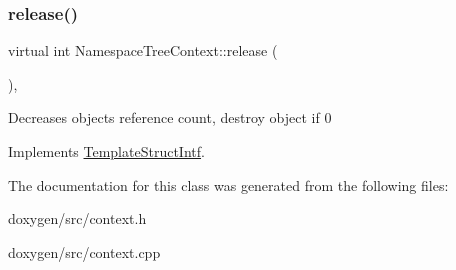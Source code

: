 \mbox{\label{class_namespace_tree_context_aa867e3f0d1ad5b49d6b0c72528f54c2e}} 
\subsubsection{\texorpdfstring{release()}{release()}}
{\footnotesize\ttfamily virtual int Namespace\+Tree\+Context\+::release (\begin{DoxyParamCaption}{ }\end{DoxyParamCaption})\hspace{0.3cm}{\ttfamily [inline]}, {\ttfamily [virtual]}}

Decreases object\textquotesingle{}s reference count, destroy object if 0 

Implements \mbox{\hyperlink{class_template_struct_intf_a3dce7dd29d3f66a8080b40578e8a5045}{Template\+Struct\+Intf}}.



The documentation for this class was generated from the following files\+:\begin{DoxyCompactItemize}
\item 
doxygen/src/context.\+h\item 
doxygen/src/context.\+cpp\end{DoxyCompactItemize}
